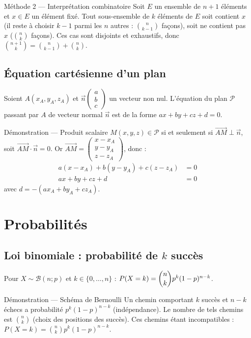 \documentclass[11pt,a4paper,openany]{book}
\theoremstyle{definition}
\newcommand{\vc}[1]{\overrightarrow{#1}}
\newcommand{\vcb}[3]{
    \left(\begin{array}{c}
        #1\\
        #2\\
        #3
    \end{array}\right)}
\begin{document}
    \begin{methodebox}{Méthode 2 — Interprétation combinatoire}
    Soit $E$ un ensemble de $n+1$ éléments et $x\in E$ un élément fixé.
    Tout sous-ensemble de $k$ éléments de $E$ soit contient $x$ (il reste à choisir $k-1$ parmi les $n$ autres : $\binom{n}{k-1}$ façons), soit ne contient pas $x$ ($\binom{n}{k}$ façons).
    Ces cas sont disjoints et exhaustifs, donc $\binom{n+1}{k}=\binom{n}{k-1}+\binom{n}{k}$.
    \end{methodebox}

    \subsection{Équation cartésienne d'un plan}

    \begin{enoncebox}
    Soient $A(x_A,y_A,z_A)$ et $\vc{n}\vcb{a}{b}{c}$ un vecteur non nul.
    L'équation du plan $\mathcal{P}$ passant par $A$ de vecteur normal $\vc{n}$ est de la forme $ax+by+cz+d=0$.
    \end{enoncebox}

    \begin{methodebox}{Démonstration — Produit scalaire}
    $M(x,y,z)\in\mathcal{P}$ si et seulement si $\vc{AM}\perp\vc{n}$, soit $\vc{AM}\cdot\vc{n}=0$.
    Or $\vc{AM}=\vcb{x-x_A}{y-y_A}{z-z_A}$, donc :
    \begin{align*}
    a(x-x_A)+b(y-y_A)+c(z-z_A)&=0\\
    ax+by+cz+d&=0
    \end{align*}
    avec $d=-(ax_A+by_A+cz_A)$.
    \end{methodebox}

    \section{Probabilités}

    \subsection{Loi binomiale : probabilité de $k$ succès}

    \begin{enoncebox}
    Pour $X\sim\mathcal{B}(n;p)$ et $k\in\{0,\ldots,n\}$ :
    $P(X=k)=\dbinom{n}{k}p^k(1-p)^{n-k}$.
    \end{enoncebox}

    \begin{methodebox}{Démonstration — Schéma de Bernoulli}
    Un chemin comportant $k$ succès et $n-k$ échecs a probabilité $p^k(1-p)^{n-k}$ (indépendance).
    Le nombre de tels chemins est $\binom{n}{k}$ (choix des positions des succès).
    Ces chemins étant incompatibles : $P(X=k)=\binom{n}{k}p^k(1-p)^{n-k}$.
    \end{methodebox}
\end{document}
